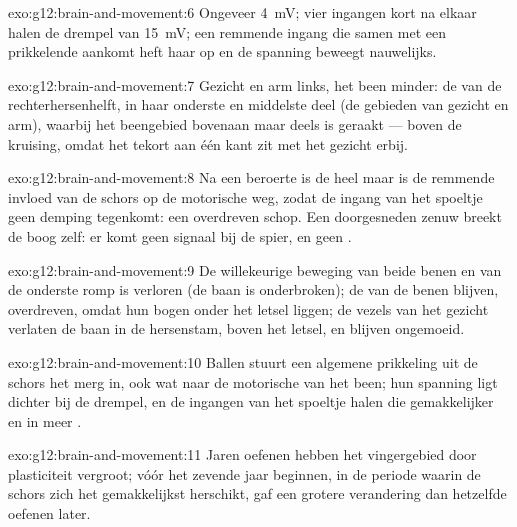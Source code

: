 \begin{solution}{exo:g12:brain-and-movement:6}
Ongeveer \qty{4}{mV}; vier ingangen kort na elkaar halen de drempel van
\qty{15}{mV}; een remmende ingang die samen met een prikkelende aankomt
heft haar op en de spanning beweegt nauwelijks.
\end{solution}

\begin{solution}{exo:g12:brain-and-movement:7}
Gezicht en arm links, het been minder: de  van de
rechterhersenhelft, in haar onderste en middelste deel (de gebieden van
gezicht en arm), waarbij het beengebied bovenaan maar deels is geraakt ---
boven de kruising, omdat het tekort aan één kant zit met het gezicht erbij.
\end{solution}

\begin{solution}{exo:g12:brain-and-movement:8}
Na een beroerte is de  heel maar is de remmende invloed van de
schors op de motorische  weg, zodat de ingang van het spoeltje
geen demping tegenkomt: een overdreven schop. Een doorgesneden zenuw
breekt de boog zelf: er komt geen signaal bij de spier, en geen .
\end{solution}

\begin{solution}{exo:g12:brain-and-movement:9}
De willekeurige beweging van beide benen en van de onderste romp is
verloren (de baan is onderbroken); de  van de benen blijven,
overdreven, omdat hun bogen onder het letsel liggen; de vezels van het
gezicht verlaten de baan in de hersenstam, boven het letsel, en blijven
ongemoeid.
\end{solution}

\begin{solution}{exo:g12:brain-and-movement:10}
Ballen stuurt een algemene prikkeling uit de schors het merg in, ook wat
naar de motorische  van het been; hun spanning ligt dichter bij de
drempel, en de ingangen van het spoeltje halen die gemakkelijker en in
meer .
\end{solution}

\begin{solution}{exo:g12:brain-and-movement:11}
Jaren oefenen hebben het vingergebied door plasticiteit vergroot; vóór het
zevende jaar beginnen, in de periode waarin de schors zich het
gemakkelijkst herschikt, gaf een grotere verandering dan hetzelfde oefenen
later.
\end{solution}

